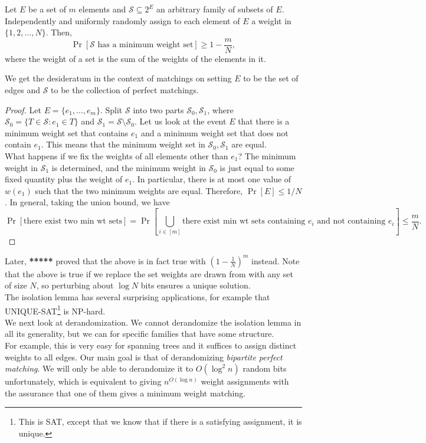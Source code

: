 			\begin{flem}
				Let $E$ be a set of $m$ elements and $\mathcal{S} \subseteq 2^E$ an arbitrary family of subsets of $E$. Independently and uniformly randomly assign to each element of $E$ a weight in $\{1,2,\ldots,N\}$. Then,
				\[ \Pr\left[ \mathcal{S} \text{ has a minimum weight set} \right] \ge 1 - \frac{m}{N}, \]
				where the weight of a set is the sum of the weights of the elements in it.
			\end{flem}
			We get the desideratum in the context of matchings on setting $E$ to be the set of edges and $\mathcal{S}$ to be the collection of perfect matchings. 
			\begin{proof}
				Let $E = \{e_1,\ldots,e_m\}$. Split $\mathcal{S}$ into two parts $\mathcal{S}_0,\mathcal{S}_1$, where $\mathcal{S}_0 = \{ T \in \mathcal{S} : e_1 \in T \}$ and $\mathcal{S}_1 = \mathcal{S} \setminus \mathcal{S}_0$. Let us look at the event $E$ that there is a minimum weight set that contains $e_1$ and a minimum weight set that does not contain $e_1$. This means that the minimum weight set in $\mathcal{S}_0,\mathcal{S}_1$ are equal.\\
				What happens if we fix the weights of all elements other than $e_1$? The minimum weight in $\mathcal{S}_1$ is determined, and the minimum weight in $\mathcal{S_0}$ is just equal to some fixed quantity plus the weight of $e_1$. In particular, there is at most one value of $w(e_1)$ such that the two minimum weights are equal. Therefore, $\Pr[E] \le 1/N$. In general, taking the union bound, we have
				\[ \Pr[\text{there exist two min wt sets}] = \Pr\left[ \bigcup_{i \in [m]} \text{there exist min wt sets containing $e_i$ and not containing $e_i$} \right] \le \frac{m}{N}. \]
			\end{proof}
			Later, \textbf{*****} proved that the above is in fact true with $\left( 1 - \frac{1}{N} \right)^m$ instead. Note that the above is true if we replace the set weights are drawn from with any set of size $N$, so perturbing about $\log N$ bits ensures a unique solution.\\

			The isolation lemma has several surprising applications, for example that \textsf{UNIQUE-SAT}\footnote{This is \textsf{SAT}, except that we know that if there is a satisfying assignment, it is unique.} is \textsf{NP}-hard.\\

			We next look at derandomization. We cannot derandomize the isolation lemma in all its generality, but we can for specific families that have some structure.\\
			For example, this is very easy for spanning trees and it suffices to assign distinct weights to all edges. Our main goal is that of derandomizing \emph{bipartite perfect matching}. We will only be able to derandomize it to $O(\log^2n)$ random bits unfortunately, which is equivalent to giving $n^{O(\log n)}$ weight assignments with the assurance that one of them gives a minimum weight matching.\\

